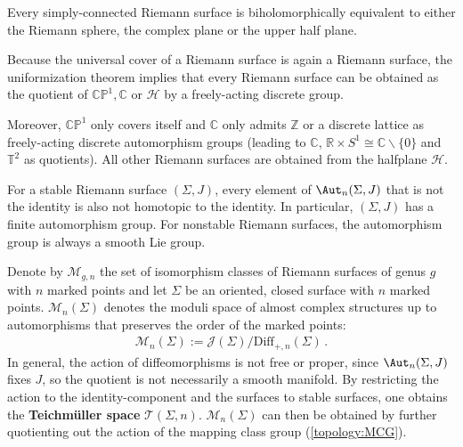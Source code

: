     \begin{theorem}
        Every simply-connected Riemann surface is biholomorphically equivalent to either the Riemann sphere, the complex plane or the upper half plane.
    \end{theorem}
    \begin{result}
        Because the universal cover of a Riemann surface is again a Riemann surface, the uniformization theorem implies that every Riemann surface can be obtained as the quotient of $\mathbb{CP}^1,\mathbb{C}$ or $\mathcal{H}$ by a freely-acting discrete group.

        Moreover, $\mathbb{CP}^1$ only covers itself and $\mathbb{C}$ only admits $\mathbb{Z}$ or a discrete lattice as freely-acting discrete automorphism groups (leading to $\mathbb{C}$, $\mathbb{R}\times S^1\cong\mathbb{C}\backslash\{0\}$ and $\mathbb{T}^2$ as quotients). All other Riemann surfaces are obtained from the halfplane $\mathcal{H}$.
    \end{result}

    \begin{property}
        For a stable Riemann surface $(\Sigma,J)$, every element of $\Aut_n(\Sigma,J)$ that is not the identity is also not homotopic to the identity. In particular, $(\Sigma,J)$ has a finite automorphism group. For nonstable Riemann surfaces, the automorphism group is always a smooth Lie group.
    \end{property}

    \begin{construct}
        Denote by $\mathcal{M}_{g,n}$ the set of isomorphism classes of Riemann surfaces of genus $g$ with $n$ marked points and let $\Sigma$ be an oriented, closed surface with $n$ marked points. $\mathcal{M}_n(\Sigma)$ denotes the moduli space of almost complex structures up to automorphisms that preserves the order of the marked points:
        \begin{gather}
            \mathcal{M}_n(\Sigma) := \mathcal{J}(\Sigma)/\mathrm{Diff}_{+,n}(\Sigma)\,.
        \end{gather}
        In general, the action of diffeomorphisms is not free or proper, since $\Aut_n(\Sigma,J)$ fixes $J$, so the quotient is not necessarily a smooth manifold. By restricting the action to the identity-component and the surfaces to stable surfaces, one obtains the \textbf{Teichm\"uller space} $\mathcal{T}(\Sigma,n)$. $\mathcal{M}_n(\Sigma)$ can then be obtained by further quotienting out the action of the mapping class group (\cref{topology:MCG}).
    \end{construct}

